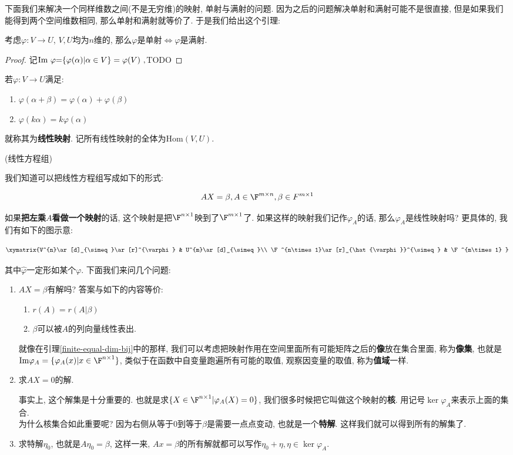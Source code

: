 下面我们来解决一个同样维数之间(不是无穷维)的映射, 单射与满射的问题. 因为之后的问题解决单射和满射可能不是很直接, 但是如果我们能得到两个空间维数相同,
那么单射和满射就等价了. 于是我们给出这个引理:
\begin{lem}
\label{finite-equal-dim-bij}考虑$\varphi:V\to U$, $V,U$均为$n$维的,
那么$\varphi$是单射$\Leftrightarrow$$\varphi$是满射. 
\end{lem}
\begin{proof}
记$\text{Im \ensuremath{\varphi}=\{\ensuremath{\varphi(\alpha)|\alpha\in V\}=\varphi(V)} ,}$TODO
\end{proof}
\begin{defn}
若$\varphi:V\to U$满足:
\begin{enumerate}
\item $\varphi(\alpha+\beta)=\varphi(\alpha)+\varphi(\beta)$
\item $\varphi(k\alpha)=k\varphi(\alpha)$
\end{enumerate}
就称其为\textbf{线性映射}. 记所有线性映射的全体为$\text{Hom}(V,U)$. 

\end{defn}
\begin{example}
(线性方程组)

我们知道可以把线性方程组写成如下的形式:

\[
AX=\beta,A\in\F^{m\times n},\beta\in F^{m\times1}
\]

如果\textbf{把左乘$A$看做一个映射}的话, 这个映射是把$\F^{n\times1}$映到了$\F^{m\times1}$了.
如果这样的映射我们记作$\varphi_{A}$的话, 那么$\varphi_{A}$是线性映射吗? 更具体的, 我们有如下的图示意:

\[
\xymatrix{V^{n}\ar[d]_{\simeq}\ar[r]^{\varphi} & U^{m}\ar[d]_{\simeq}\\
\F^{n\times1}\ar[r]_{\hat{\varphi}}^{\simeq} & \F^{m\times1}
}
\]

其中$\hat{\varphi}$一定形如某个$\varphi$. 下面我们来问几个问题:
\begin{enumerate}
\item $AX=\beta$有解吗? 答案与如下的内容等价: 
\begin{enumerate}
\item $r(A)=r(A|\beta)$
\item $\beta$可以被$A$的列向量线性表出. 
\end{enumerate}
就像在引理\ref{finite-equal-dim-bij}中的那样, 我们可以考虑把映射作用在空间里面所有可能矩阵之后的\textbf{像}放在集合里面,
称为\textbf{像集}, 也就是$\text{Im}\varphi_{A}=\{\varphi_{A}(x)|x\in\F^{n\times1}\}$,
类似于在函数中自变量跑遍所有可能的取值, 观察因变量的取值, 称为\textbf{值域}一样. 
\item 求$AX=0$的解. 

事实上, 这个解集是十分重要的. 也就是求$\{X\in\F^{n\times1}|\varphi_{A}(X)=0\}$, 我们很多时候把它叫做这个映射的\textbf{核}.
用记号$\ker\varphi_{A}$来表示上面的集合. \\
为什么核集合如此重要呢? 因为右侧从等于0到等于$\beta$是需要一点点变动, 也就是一个\textbf{特解}. 这样我们就可以得到所有的解集了. 
\item 求特解$\eta_{0}$, 也就是$A\eta_{0}=\beta$, 这样一来, $Ax=\beta$的所有解就都可以写作$\eta_{0}+\eta,\eta\in\ker\varphi_{A}$. 
\end{enumerate}
\end{example}
